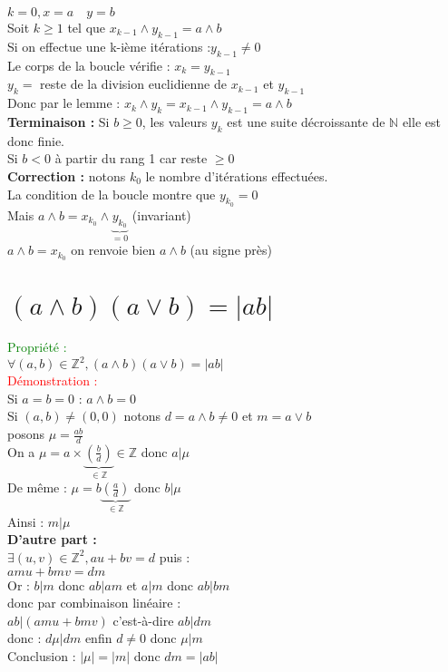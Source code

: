 \documentclass{article}
\begin{document}
$k=0,x=a \quad y=b$ \\ 
Soit $k \geq 1$ tel que $x_{k-1} \wedge y_{k-1}=a \wedge b$ \\ 
Si on effectue une k-ième itérations :$y_{k-1} \neq 0$ \\ 
Le corps de la boucle vérifie : $x_k=y_{k-1}$\\ 
$y_k=$ reste de la division euclidienne de $x_{k-1}$ et $y_{k-1}$ \\ 
Donc par le lemme : $x_k \wedge y_k =x_{k-1} \wedge y_{k-1}=a \wedge b$ \\ 
{\bf Terminaison :} Si $b \geq 0$, les valeurs $y_k$ est une suite décroissante de $\mathbb{N}$ elle est donc finie. \\ 
Si $b<0$ à partir du rang 1  car reste $\geq 0$ \\ 
{\bf Correction :} notons $k_0$ le nombre d'itérations effectuées.\\ 
La condition de la boucle montre que $y_{k_0}=0$ \\
Mais $a \wedge b =x_{k_0} \wedge \underbrace{y_{k_0}}_{=0}$ (invariant) \\ 
$a \wedge b=x_{k_0}$ on renvoie bien $a \wedge b$ (au signe près) 
\section{$(a \wedge b)(a \vee b)= |ab|$}
\textcolor{green}{Propriété :} \\ 
$\forall (a,b) \in \mathbb{Z}^2, ( a \wedge b)(a \vee b)=|ab|$ \\ 
\textcolor{red}{Démonstration :} \\ 
Si $a=b=0$ : $a \wedge b=0$ \\ 
Si $(a,b) \neq (0,0)$ notons $d=a\wedge b \neq 0$ et $m=a \vee b$ \\ 
posons $\mu=\frac{ab}{d}$ \\ 
On a $\mu=a \times \underbrace{(\frac{b}{d})}_{\in \mathbb{Z}}\in \mathbb{Z}$ donc $a | \mu$\\
De même : $\mu=b\underbrace{(\frac{a}{d})}_{\in \mathbb{Z}}$ donc $b|\mu$ \\ 
Ainsi : $m| \mu$ \\ 
{\bf D'autre part :} \\ 
$\exists (u,v) \in \mathbb{Z}^2,au+bv=d$ puis : \\ 
$amu+bmv=dm$ \\ 
Or : $b |m$ donc $ab|am$ et $a|m$ donc $ab|bm$ \\ 
donc par combinaison linéaire : \\ 
$ab|(amu+bmv)$ c'est-à-dire $ab|dm$ \\ 
donc : $d\mu |dm$ enfin $d \neq 0$ donc $\mu |m$ \\ 
Conclusion : $|\mu|=|m|$ donc $dm=|ab|$
\end{document}
